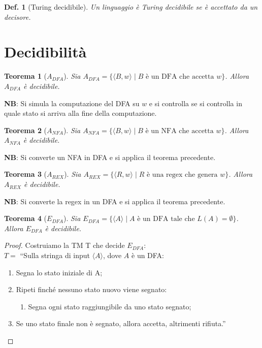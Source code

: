 \documentclass[11pt]{article}
\newtheorem{definition}{Def.}[section]
\newtheorem{theorem}{Teorema}[section]
\newtheorem{proof}{Dimostrazione}[section]
\begin{document}
\begin{definition}[Turing decidibile]
	Un linguaggio è Turing decidibile se è accettato da un decisore.
\end{definition}

\section{Decidibilità}

\begin{theorem}[$A_{DFA}$]
	Sia $A_{DFA} = \{\langle B, w \rangle \mid B \text{ è un DFA che accetta } 
	w\}$. Allora $A_{DFA}$ è decidibile.
\end{theorem}

\textbf{NB}: Si simula la computazione del DFA su $w$ e si controlla se si
controlla in quale stato si arriva alla fine della computazione.

\begin{theorem}[$A_{NFA}$]
	Sia $A_{NFA} = \{\langle B, w \rangle \mid B \text{ è un NFA che accetta } 
	w\}$. Allora $A_{NFA}$ è decidibile.
\end{theorem}

\textbf{NB}: Si converte un NFA in DFA e si applica il teorema precedente.

\begin{theorem}[$A_{REX}$]
	Sia $A_{REX} = \{\langle R, w \rangle \mid R \text{ è una regex che genera } 
	w\}$. Allora $A_{REX}$ è decidibile.
\end{theorem}

\textbf{NB}: Si converte la regex in un DFA e si applica il teorema precedente.

\begin{theorem}[$E_{DFA}$]
	Sia $E_{DFA} = \{\langle A \rangle \mid A \text{ è un DFA tale che } L(A) = 
	\emptyset\}$. Allora $E_{DFA}$ è decidibile.
\end{theorem}

\begin{proof}
Costruiamo la TM T che decide $E_{DFA}$:\\

$T = $ ``Sulla stringa di input $\langle A \rangle$, dove $A$ è un DFA:
\begin{enumerate}
	\item Segna lo stato iniziale di A;
	\item Ripeti finché nessuno stato nuovo viene segnato:
	\begin{enumerate}
		\item Segna ogni stato raggiungibile da uno stato segnato;
	\end{enumerate}
	\item Se uno stato finale non è segnato, allora accetta, altrimenti
		rifiuta.''
\end{enumerate}
\end{proof}
\end{document}
